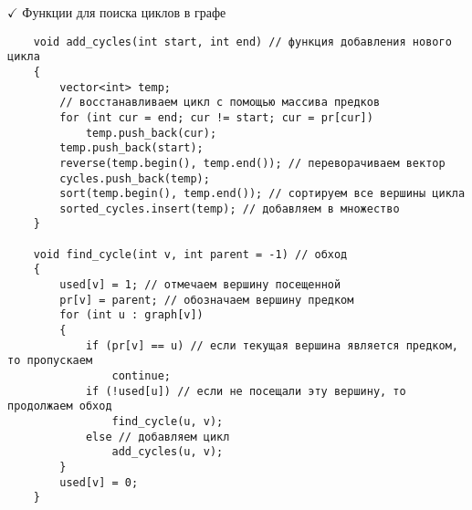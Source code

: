 \documentclass[a4paper, 14pt]{extarticle}
\begin{document}
$\checkmark$ Функции для поиска циклов в графе
\begin{verbatim}
    void add_cycles(int start, int end) // функция добавления нового цикла
    { 
        vector<int> temp;
        // восстанавливаем цикл с помощью массива предков
        for (int cur = end; cur != start; cur = pr[cur])
            temp.push_back(cur);
        temp.push_back(start);
        reverse(temp.begin(), temp.end()); // переворачиваем вектор
        cycles.push_back(temp); 
        sort(temp.begin(), temp.end()); // сортируем все вершины цикла
        sorted_cycles.insert(temp); // добавляем в множество
    }

    void find_cycle(int v, int parent = -1) // обход
    { 
        used[v] = 1; // отмечаем вершину посещенной
        pr[v] = parent; // обозначаем вершину предком
        for (int u : graph[v]) 
        {
            if (pr[v] == u) // если текущая вершина является предком, то пропускаем
                continue; 
            if (!used[u]) // если не посещали эту вершину, то продолжаем обход
                find_cycle(u, v);  
            else // добавляем цикл
                add_cycles(u, v); 
        }
        used[v] = 0;
    }
\end{verbatim}
\end{document}
